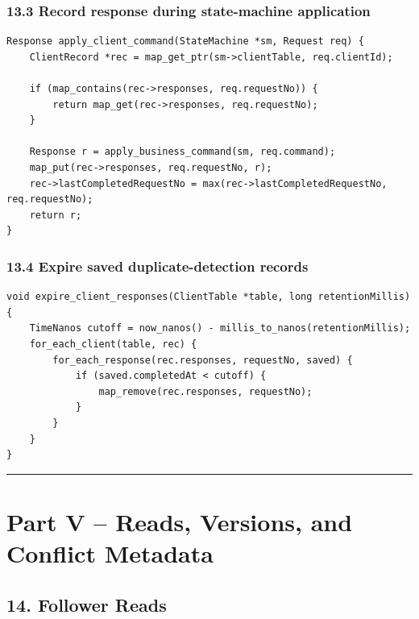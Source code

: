 \documentclass[10pt,letterpaper]{article}
\begin{document}
\subsubsection*{13.3 Record response during state-machine application}

\begin{verbatim}
Response apply_client_command(StateMachine *sm, Request req) {
    ClientRecord *rec = map_get_ptr(sm->clientTable, req.clientId);

    if (map_contains(rec->responses, req.requestNo)) {
        return map_get(rec->responses, req.requestNo);
    }

    Response r = apply_business_command(sm, req.command);
    map_put(rec->responses, req.requestNo, r);
    rec->lastCompletedRequestNo = max(rec->lastCompletedRequestNo, req.requestNo);
    return r;
}
\end{verbatim}

\subsubsection*{13.4 Expire saved duplicate-detection records}

\begin{verbatim}
void expire_client_responses(ClientTable *table, long retentionMillis) {
    TimeNanos cutoff = now_nanos() - millis_to_nanos(retentionMillis);
    for_each_client(table, rec) {
        for_each_response(rec.responses, requestNo, saved) {
            if (saved.completedAt < cutoff) {
                map_remove(rec.responses, requestNo);
            }
        }
    }
}
\end{verbatim}

\medskip\hrule\medskip

\clearpage
\section*{Part V -- Reads, Versions, and Conflict Metadata}

\subsection*{14. Follower Reads}
\end{document}
